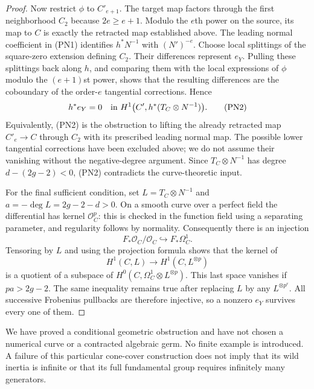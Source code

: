 \begin{proof}
Now restrict $\phi$ to $C'_{e+1}$.  The target map factors through
the first neighborhood $C_2$ because $2e\geq e+1$.  Modulo the
$e$th power on the source, its map to $C$ is exactly the retracted
map established above.  The leading normal coefficient in (PN1)
identifies $h^*N^{-1}$ with $(N')^{-e}$.
Choose local splittings of the square-zero extension defining $C_2$.
Their differences represent $e_Y$.  Pulling these splittings back
along $h$, and comparing them with the local expressions of $\phi$
modulo the $(e+1)$st power, shows that the resulting differences are
the coboundary of the order-$e$ tangential corrections.  Hence
\[
 h^*e_Y=0
       \quad\hbox{in }H^1\bigl(C',h^*(T_C\otimes N^{-1})\bigr).
                                                               \tag{PN2}
\]
Equivalently, (PN2) is the obstruction to lifting the already retracted
map $C'_e\to C$ through $C_2$ with its prescribed leading normal map.
The possible lower tangential corrections have been excluded above;
we do not assume their vanishing without the negative-degree argument.
Since $T_C\otimes N^{-1}$ has degree $d-(2g-2)<0$, (PN2) contradicts
the curve-theoretic input.

For the final sufficient condition, set $L=T_C\otimes N^{-1}$ and
$a=-\deg L=2g-2-d>0$.  On a smooth curve over a perfect field the
differential has kernel $\mathcal O_C^p$: this is checked in the
function field using a separating parameter, and regularity follows
by normality.  Consequently there is an injection
\[
           F_*\mathcal O_C/\mathcal O_C\hookrightarrow F_*\Omega_C^1.
\]
Tensoring by $L$ and using the projection formula shows that the
kernel of
\[
                    H^1(C,L)\longrightarrow H^1(C,L^{\otimes p})
\]
is a quotient of a subspace of
$H^0(C,\Omega_C^1\otimes L^{\otimes p})$.
This last space vanishes if $pa>2g-2$.  The same inequality remains
true after replacing $L$ by any $L^{\otimes p^r}$.
All successive Frobenius pullbacks are therefore injective, so a
nonzero $e_Y$ survives every one of them.
\end{proof}

\begin{remark}
We have proved a conditional geometric obstruction and have not
chosen a numerical curve or a contracted algebraic germ.  No finite
example is introduced.  A failure of this particular cone-cover
construction does not imply that its wild inertia is infinite or that
its full fundamental group requires infinitely many generators.
\end{remark}

